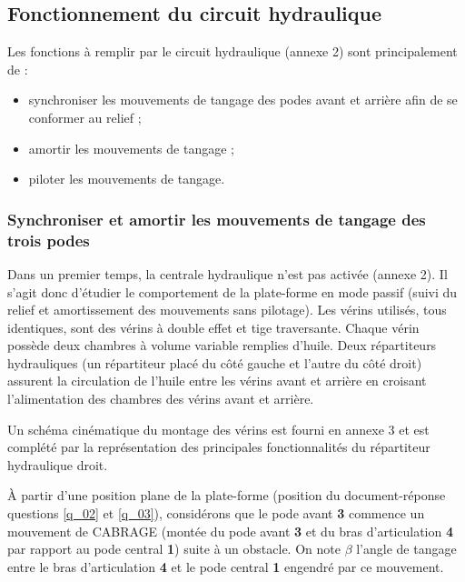 \subsection{Fonctionnement du circuit hydraulique}
\ifprof
\else
Les fonctions à remplir par le circuit hydraulique (annexe 2) sont principalement de :
\begin{itemize}
\item synchroniser les mouvements de tangage des podes avant et arrière afin de se conformer au relief ;
\item amortir les mouvements de tangage ;
\item piloter les mouvements de tangage.
\end{itemize}
\fi

\subsubsection{Synchroniser et amortir les mouvements de tangage des trois podes}
\ifprof
\else

Dans un premier temps, la centrale hydraulique n’est pas activée (annexe 2). Il s’agit donc d’étudier le comportement
de la plate-forme en mode passif (suivi du relief et amortissement des mouvements sans pilotage).
Les vérins utilisés, tous identiques, sont des vérins à double effet et tige traversante. Chaque vérin possède deux
chambres à volume variable remplies d’huile. Deux répartiteurs hydrauliques (un répartiteur placé du côté gauche et
l’autre du côté droit) assurent la circulation de l’huile entre les vérins avant et arrière en croisant l’alimentation des
chambres des vérins avant et arrière.

Un schéma cinématique du montage des vérins est fourni en annexe 3 et est complété par la représentation des
principales fonctionnalités du répartiteur hydraulique droit.
\fi


\ifprof
\begin{corrige}
\end{corrige}
\else
\fi

\ifprof
\else

À partir d’une position plane de la plate-forme (position du document-réponse questions \ref{q_02} et \ref{q_03}), considérons que le pode avant \textbf{3} commence un mouvement de CABRAGE (montée du pode avant \textbf{3} et du bras d’articulation \textbf{4} par rapport au pode central \textbf{1}) suite à un obstacle. On note $\beta$ l’angle de tangage entre le bras d’articulation \textbf{4} et le pode central \textbf{1} engendré par ce mouvement.
\fi

